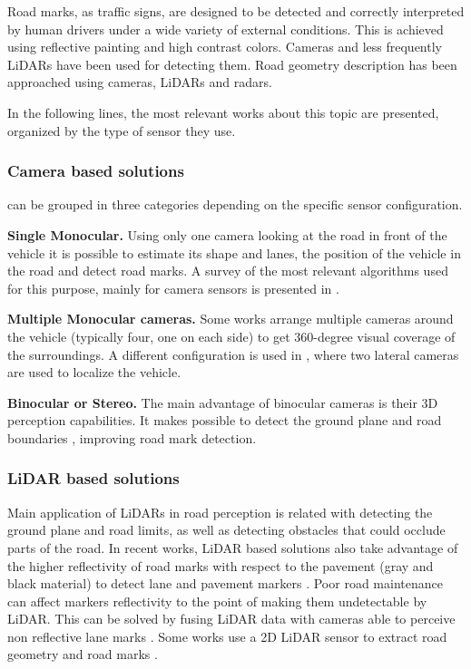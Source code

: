 \documentclass[journal]{IEEEtran}
\begin{document}
Road marks, as traffic signs, are designed to be detected and 
correctly interpreted by human drivers under a wide variety of external 
conditions. This is achieved using reflective painting and high contrast 
colors. Cameras and less frequently LiDARs have been used for detecting them.
Road geometry description has been approached using cameras, LiDARs and radars.

In the following lines, the most relevant works about this topic are presented, 
organized by the type of sensor they use.


\subsubsection{Camera based solutions}
can be grouped in three categories depending on the specific sensor 
configuration.

\textbf{Single Monocular.}
Using only one 
camera looking at the road in front of the vehicle it is possible to estimate 
its shape and lanes, the position of the vehicle in the road and  
detect road marks. A survey of the most 
relevant algorithms used for this purpose, mainly for camera sensors is 
presented in \cite{hillel2014recent}.

\textbf{Multiple Monocular cameras.} 
Some works \cite{lee2017avm, kum2013lane} arrange multiple cameras 
around the vehicle (typically four, one on each side) to get 360-degree 
visual coverage of the surroundings. 
A different configuration is used in \cite{Ieng2003}, where two lateral cameras
are used to localize the vehicle. 

\textbf{Binocular or Stereo.} 
The main advantage of binocular cameras is their 3D perception capabilities.
It makes possible to detect the ground plane and road boundaries 
\cite{schreiber2013laneloc, ozgunalp2017multiple}, improving road mark 
detection. 

\subsubsection{LiDAR based solutions}
Main application of LiDARs in road perception is related with detecting the 
ground plane and road limits, as well as detecting obstacles that could occlude 
parts of the road.
In recent works, LiDAR based solutions also take advantage of the higher 
reflectivity of road marks with respect to the pavement (gray and black 
material) to detect lane \cite{yang2012automated, li2013new} and
pavement markers \cite{Zhang2016}.
Poor road maintenance can affect markers reflectivity to the point of making 
them undetectable by LiDAR. This can be solved by fusing LiDAR 
data with cameras able to perceive non reflective lane marks \cite{lee2017avm}.
Some works use a 2D LiDAR sensor to extract road geometry and road marks 
\cite{nie2012camera, kim2015lane}.
\end{document}
